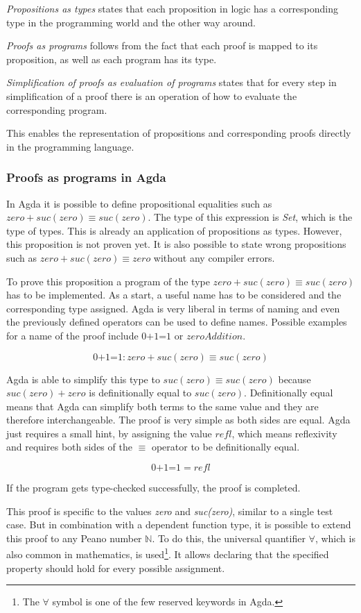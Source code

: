 \emph{Propositions as types} states that each proposition in logic has a corresponding type in the programming world and the other way around. 

\emph{Proofs as programs} follows from the fact that each proof is mapped to its proposition, as well as each program has its type.

\emph{Simplification of proofs as evaluation of programs} states that for every step in simplification of a proof there is an operation of how to evaluate the corresponding program.

This enables the representation of propositions and corresponding proofs directly in the programming language.

\subsubsection{Proofs as programs in Agda}
In Agda it is possible to define propositional equalities such as $zero + suc(zero) \equiv suc(zero)$. The type of this expression is \emph{Set}, which is the type of types.
This is already an application of propositions as types.
However, this proposition is not proven yet.
It is also possible to state wrong propositions such as $zero + suc(zero) \equiv zero$ without any compiler errors.

To prove this proposition a program of the type $zero + suc(zero) \equiv suc(zero)$ has to be implemented.
As a start, a useful name has to be considered and the corresponding type assigned.
Agda is very liberal in terms of naming and even the previously defined operators can be used to define names.
Possible examples for a name of the proof include $\text{0+1=1}$ or $zeroAddition$.

$$\text{0+1=1} : zero + suc(zero) \equiv suc(zero)$$

Agda is able to simplify this type to $suc(zero) \equiv suc(zero)$ because $suc(zero) + zero$ is definitionally equal to $suc(zero)$. Definitionally equal means that Agda can simplify both terms to the same value and they are therefore interchangeable.
The proof is very simple as both sides are equal. 
Agda just requires a small hint, by assigning the value $refl$, which means reflexivity and requires both sides of the $\equiv$ operator to be definitionally equal.

$$\text{0+1=1} = refl$$

If the program gets type-checked successfully, the proof is completed.

This proof is specific to the values \emph{zero} and \emph{suc(zero)}, similar to a single test case.
But in combination with a dependent function type, it is possible to extend this proof to any Peano number $\mathbb{N}$. 
To do this, the universal quantifier $\forall$, which is also common in mathematics, is used\footnote{The $\forall$ symbol is one of the few reserved keywords in Agda.}.
It allows declaring that the specified property should hold for every possible assignment\cite{plfa2019}.


